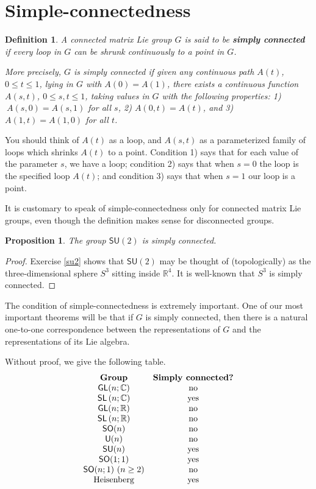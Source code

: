 \documentclass[12pt]{amsbook}
\theoremstyle{plain}
\newtheorem{definition}[theorem]{Definition}
\newtheorem{proposition}[theorem]{Proposition}
\numberwithin{equation}{chapter}
\numberwithin{theorem}{chapter}
\begin{document}
\section{Simple-connectedness}

\begin{definition}
A connected matrix Lie group $G$ is said to be \textbf{simply connected} if
every loop in $G$ can be shrunk continuously to a point in $G$.

More precisely, $G$ is simply connected if given any continuous path $A(t)$,
$0\leq t\leq1$, lying in $G$ with $A(0)=A(1)$, there exists a continuous
function $A(s,t)$, $0\leq s,t\leq1$, taking values in $G$ with the following
properties: 1)$~A(s,0)=A(s,1)$ for all $s$, 2) $A(0,t)=A(t)$, and 3)
$A(1,t)=A(1,0)$ for all $t$.
\end{definition}

You should think of $A(t)$ as a loop, and $A(s,t)$ as a parameterized family
of loops which shrinks $A(t)$ to a point. Condition 1) says that for each
value of the parameter $s$, we have a loop; condition 2) says that when $s=0$
the loop is the specified loop $A(t)$; and condition 3) says that when $s=1$
our loop is a point.

It is customary to speak of simple-connectedness only for connected matrix Lie
groups, even though the definition makes sense for disconnected groups.

\begin{proposition}
\label{su2.sc}The group $\mathsf{SU}(2)$ is simply connected.
\end{proposition}

\begin{proof}
Exercise \ref{su2} shows that $\mathsf{SU}(2)$ may be thought of
(topologically) as the three-dimensional sphere $S^{3}$ sitting inside
$\mathbb{R}^{4}$. It is well-known that $S^{3}$ is simply connected.
\end{proof}

The condition of simple-connectedness is extremely important. One of our most
important theorems will be that if $G$ is simply connected, then there is a
natural one-to-one correspondence between the representations of $G$ and the
representations of its Lie algebra.

Without proof, we give the following table.
\[%
\begin{array}
[c]{cc}%
\text{\textbf{Group}} & \text{\textbf{Simply connected?}}\\
\mathsf{GL}(n;\mathbb{C}) & \text{no}\\
\mathsf{SL}\left(  n;\mathbb{C}\right)  & \text{yes}\\
\mathsf{GL}(n;\mathbb{R}) & \text{no}\\
\mathsf{SL}\left(  n;\mathbb{R}\right)  & \text{no}\\
\mathsf{SO}(n) & \text{no}\\
\mathsf{U}(n) & \text{no}\\
\mathsf{SU}(n) & \text{yes}\\
\mathsf{SO}(1;1) & \text{yes}\\
\mathsf{SO}(n;1)\text{ (}n\ge2\text{)} & \text{no}\\
\text{Heisenberg} & \text{yes}%
\end{array}
\]
\end{document}
